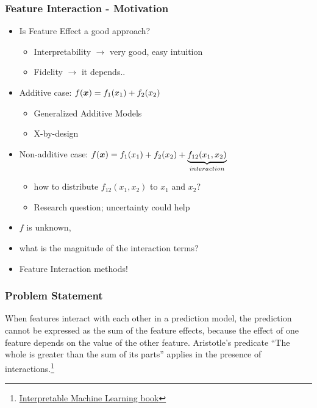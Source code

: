 \begin{frame}
  \frametitle{Feature Interaction - Motivation}
  \begin{itemize}
  \item Is Feature Effect a good approach?
    \begin{itemize}
    \item Interpretability $\rightarrow$ very good, easy intuition
    \item Fidelity $\rightarrow$ it depends..
    \end{itemize}
  \item Additive case: \(f(\boldsymbol{x}) = f_1(x_1) + f_2(x_2)\)
    \begin{itemize}
    \item Generalized Additive Models
      \item X-by-design
    \end{itemize}

\item Non-additive case: \(f(\boldsymbol{x}) = f_1(x_1) + f_2(x_2) + \underbrace{f_{12}(x_1, x_2)}_{interaction}\)
  \begin{itemize}
  \item how to distribute \(f_{12}(x_1, x_2)\) to \(x_1\) and \(x_2\)?
  \item Research question; uncertainty could help
  \end{itemize}
  \item \(f\) is unknown,
  \item what is the magnitude of the interaction terms?
  \item Feature Interaction methods!
\end{itemize}
\end{frame}


\begin{frame}
  \frametitle{Problem Statement}
  When features interact with each other in a prediction model, the prediction cannot be expressed as the sum of the feature effects, because the effect of one feature depends on the value of the other feature. Aristotle’s predicate “The whole is greater than the sum of its parts” applies in the presence of interactions.\footnote{\href{https://christophm.github.io/interpretable-ml-book/interaction.html}{Interpretable Machine Learning book}}
\end{frame}



